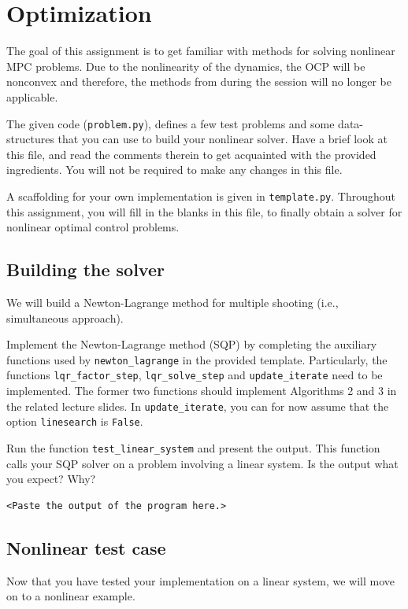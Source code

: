 \documentclass[]{article}
\begin{document}
\newpage 
\section{Optimization}

The goal of this assignment is to get familiar with methods for solving nonlinear MPC problems. 
Due to the nonlinearity of the dynamics, the OCP
will be nonconvex and therefore, the methods from during the session will no longer be applicable. 

The given code (\texttt{problem.py}), 
defines a few test problems and some data-structures that 
you can use to build your nonlinear solver. Have a brief 
look at this file, and read the comments therein
to get acquainted with the provided ingredients.
You will not be required to make any changes 
in this file.  

A scaffolding for your own implementation is given 
in \texttt{template.py}. Throughout this 
assignment, you will fill in the blanks in this file, 
to finally obtain a solver for nonlinear optimal control problems.

\subsection{Building the solver}
We will build a Newton-Lagrange method 
for multiple shooting (i.e., simultaneous approach).

\begin{assignment}
	Implement the Newton-Lagrange method (SQP) by 
	completing the auxiliary functions used by \texttt{newton\_lagrange} in 
	the provided template. Particularly, 
	the functions \texttt{lqr\_factor\_step}, \texttt{lqr\_solve\_step}
	and \texttt{update\_iterate} need to be implemented. The former two functions should implement 
	Algorithms 2 and 3 in the related lecture slides. 
	In \texttt{update\_iterate}, you can for now assume that the option \texttt{linesearch} is \texttt{False}.

	Run the function \texttt{test\_linear\_system} and present the output.
	This function calls your SQP solver on a problem involving 
	a linear system. Is the output what you expect? Why?
\end{assignment}
\begin{lstlisting}[style=python]
	<Paste the output of the program here.>
\end{lstlisting}


\subsection{Nonlinear test case}
Now that you have tested your implementation on a linear system,
we will move on to a nonlinear example.
\end{document}
